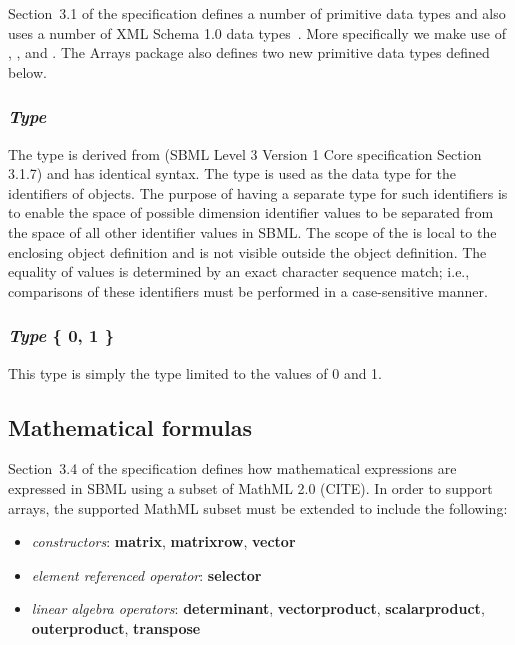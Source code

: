 Section~3.1 of the \sbmlthreecore specification defines a number of primitive data types and also uses a number of XML Schema 1.0 data types~\citep{biron:2000}.  More specifically we make use of , , and .  The Arrays package also defines two new primitive data types defined below.

\subsubsection{\emph{Type} }

The type  is derived from  (SBML Level 3 Version 1 Core specification Section 3.1.7) and has identical syntax. The  type is used as the data type for the identifiers of \Dimension objects. The purpose of having a separate type for such identifiers is to enable the space of possible dimension identifier values to be separated from the space of all other identifier values in SBML.  The scope of the  is local to the enclosing object definition and is not visible outside the object definition.  The equality of  values is determined by an exact character sequence match; i.e., comparisons of these identifiers must be performed in a case-sensitive manner.

\subsubsection{\emph{Type} \{ 0, 1 \}}

This type is simply the  type limited to the values of 0 and 1.

\subsection{Mathematical formulas}

Section~3.4 of the \sbmlthreecore specification defines how mathematical expressions are expressed in SBML using a subset of MathML 2.0 (CITE).  In order to support arrays, the supported MathML subset must be extended to include the following:
\begin{itemize}
\item \emph{constructors}: {\bf matrix}, {\bf matrixrow}, {\bf vector}
\item \emph{element referenced operator}: {\bf selector}
\item \emph{linear algebra operators}: {\bf determinant}, {\bf vectorproduct}, {\bf scalarproduct}, {\bf outerproduct}, {\bf transpose}
\end{itemize}

